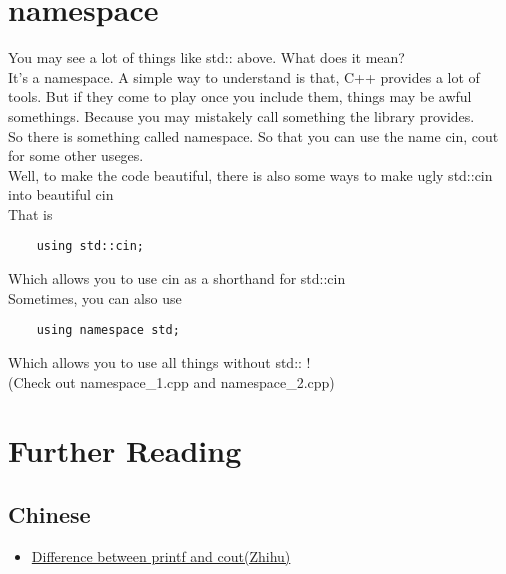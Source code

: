 \documentclass{article}
\begin{document}
\section{namespace}
You may see a lot of things like std:: above. What does it mean?\\
It's a namespace. A simple way to understand is that, C++ provides a lot of tools. But if they come to play once you include them, things may be awful somethings. Because you may mistakely call something the library provides.\\
So there is something called namespace. So that you can use the name cin, cout for some other useges.\\
Well, to make the code beautiful, there is also some ways to make ugly std::cin into beautiful cin\\
That is
\begin{lstlisting}
    using std::cin;
\end{lstlisting}
Which allows you to use cin as a shorthand for std::cin\\
Sometimes, you can also use
\begin{lstlisting}
    using namespace std;
\end{lstlisting}
Which allows you to use all things without std:: !\\
(Check out namespace\_1.cpp and namespace\_2.cpp)
\newpage
\section{Further Reading}
\subsection{Chinese}
\begin{itemize}
    \item \href{https://www.zhihu.com/question/357208801/answer/905489671}
    {Difference between printf and cout(Zhihu)}
\end{itemize}
\end{document}
